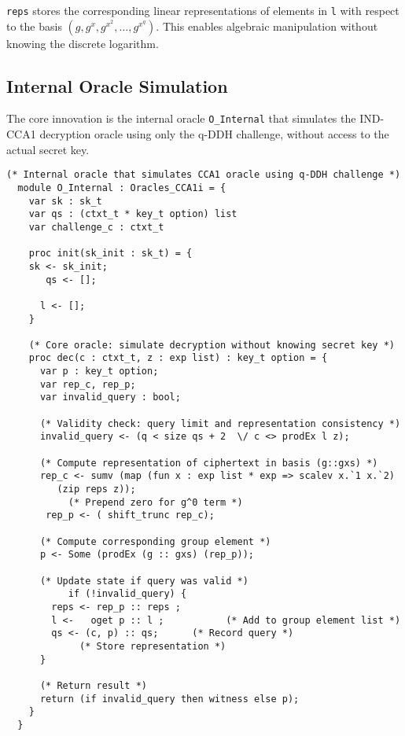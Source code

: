 \texttt{reps} stores the corresponding linear representations of elements in \texttt{l} with respect to the basis $(g, g^x, g^{x^2}, \ldots, g^{x^q})$. This enables algebraic manipulation without knowing the discrete logarithm.


\subsection{Internal Oracle Simulation}

The core innovation is the internal oracle \texttt{O\_Internal} that simulates the IND-CCA1 decryption oracle using only the q-DDH challenge, without access to the actual secret key.

\begin{lstlisting}[style=easycrypt, caption=Internal Oracle Implementation, breaklines=true, breakatwhitespace=true, frame=single, keepspaces=true]
  (* Internal oracle that simulates CCA1 oracle using q-DDH challenge *)
  module O_Internal : Oracles_CCA1i = {
    var sk : sk_t
    var qs : (ctxt_t * key_t option) list
    var challenge_c : ctxt_t 

    proc init(sk_init : sk_t) = {
    sk <- sk_init;
       qs <- [];
      
      l <- [];
    }

    (* Core oracle: simulate decryption without knowing secret key *)
    proc dec(c : ctxt_t, z : exp list) : key_t option = {
      var p : key_t option;
      var rep_c, rep_p;
      var invalid_query : bool;

      (* Validity check: query limit and representation consistency *)
      invalid_query <- (q < size qs + 2  \/ c <> prodEx l z);

      (* Compute representation of ciphertext in basis (g::gxs) *)
      rep_c <- sumv (map (fun x : exp list * exp => scalev x.`1 x.`2)
         (zip reps z)); 
           (* Prepend zero for g^0 term *)
       rep_p <- ( shift_trunc rep_c); 
      
      (* Compute corresponding group element *)
      p <- Some (prodEx (g :: gxs) (rep_p));
      
      (* Update state if query was valid *)
           if (!invalid_query) {
        reps <- rep_p :: reps ;
        l <-   oget p :: l ;           (* Add to group element list *)
        qs <- (c, p) :: qs;      (* Record query *)
             (* Store representation *)
      }
     
      (* Return result *)
      return (if invalid_query then witness else p);
    }
  }
\end{lstlisting}



